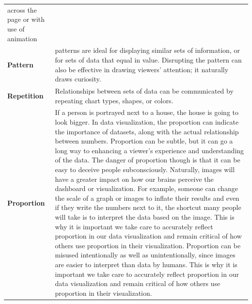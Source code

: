 \documentclass[]{book}
\theoremstyle{definition}
\theoremstyle{definition}
\theoremstyle{definition}
\theoremstyle{remark}
\begin{document}
\begin{longtable}[]{@{}ll@{}}
\begin{minipage}[t]{0.78\columnwidth}
across the page or with use of animation\strut
\end{minipage}\tabularnewline
\begin{minipage}[t]{0.16\columnwidth}\raggedright\strut
\textbf{Pattern}\strut
\end{minipage} & \begin{minipage}[t]{0.78\columnwidth}\raggedright\strut
patterns are ideal for displaying similar sets of information, or for
sets of data that equal in value. Disrupting the pattern can also be
effective in drawing viewers' attention; it naturally draws
curiosity.\strut
\end{minipage}\tabularnewline
\begin{minipage}[t]{0.16\columnwidth}\raggedright\strut
\textbf{Repetition}\strut
\end{minipage} & \begin{minipage}[t]{0.78\columnwidth}\raggedright\strut
Relationships between sets of data can be communicated by repeating
chart types, shapes, or colors.\strut
\end{minipage}\tabularnewline
\begin{minipage}[t]{0.16\columnwidth}\raggedright\strut
\textbf{Proportion}\strut
\end{minipage} & \begin{minipage}[t]{0.78\columnwidth}\raggedright\strut
If a person is portrayed next to a house, the house is going to look
bigger. In data visualization, the proportion can indicate the
importance of datasets, along with the actual relationship between
numbers. Proportion can be subtle, but it can go a long way to enhancing
a viewer's experience and understanding of the data. The danger of
proportion though is that it can be easy to deceive people
subconsciously. Naturally, images will have a greater impact on how our
brains perceive the dashboard or visualization. For example, someone can
change the scale of a graph or images to inflate their results and even
if they write the numbers next to it, the shortcut many people will take
is to interpret the data based on the image. This is why it is important
we take care to accurately reflect proportion in our data visualization
and remain critical of how others use proportion in their visualization.
Proportion can be misused intentionally as well as unintentionally,
since images are easier to interpret than data by humans. This is why it
is important we take care to accurately reflect proportion in our data
visualization and remain critical of how others use proportion in their
visualization.\strut

\end{minipage}
\end{longtable}
\end{document}
